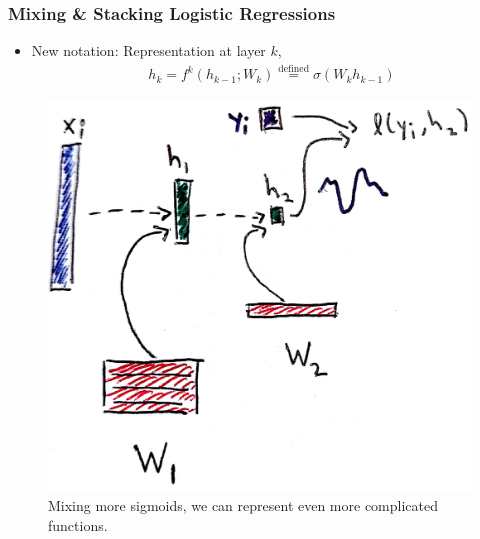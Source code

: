 \documentclass[10pt,mathserif]{beamer}
\begin{document}
\begin{frame}
  \frametitle{Mixing \& Stacking Logistic Regressions}
  \begin{itemize}
  \item New notation: Representation at layer $k$,
    \begin{align*}
      h_{k} = f^k\left(h_{k - 1}; W_k\right) \stackrel{\text{defined}}{=} \sigma\left(W_k h_{k - 1}\right)
    \end{align*}
  \end{itemize}
  \begin{figure}
    \centering
    \includegraphics[width=0.4\paperwidth]{figure/mixture_logistic_k_stacked_loss}
    \caption{Mixing more sigmoids, we can represent even more complicated
      functions. \label{fig:mixture_logistic_k_block} }
  \end{figure}
\end{frame}
\end{document}
